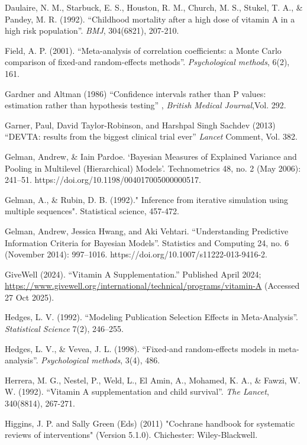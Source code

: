 \documentclass[12pt]{article}
\begin{document}
\begin{thebibliography}{99}
 Daulaire, N. M., Starbuck, E. S., Houston, R. M., Church, M. S., Stukel, T. A., \& Pandey, M. R. (1992). ``Childhood mortality after a high dose of vitamin A in a high risk population''. \emph{BMJ}, 304(6821), 207-210.

 Field, A. P. (2001). ``Meta-analysis of correlation coefficients: a Monte Carlo comparison of fixed-and random-effects methods''. \emph{Psychological methods}, 6(2), 161.

 Gardner and Altman (1986) ``Confidence intervals rather than P values: estimation rather than hypothesis testing'' , \emph{British Medical Journal},Vol. 292.

 Garner, Paul, David Taylor-Robinson, and Harshpal Singh Sachdev (2013) ``DEVTA: results from the biggest clinical trial ever'' \emph{Lancet} Comment, Vol. 382.

 Gelman, Andrew, \& Iain Pardoe. ‘Bayesian Measures of Explained Variance and Pooling in Multilevel (Hierarchical) Models’. Technometrics 48, no. 2 (May 2006): 241–51. https://doi.org/10.1198/004017005000000517.

 Gelman, A., \& Rubin, D. B. (1992)." Inference from iterative simulation using multiple sequences". Statistical science, 457-472.

 Gelman, Andrew, Jessica Hwang, and Aki Vehtari. ``Understanding Predictive Information Criteria for Bayesian Models''. Statistics and Computing 24, no. 6 (November 2014): 997–1016. https://doi.org/10.1007/s11222-013-9416-2.

 GiveWell (2024). ``Vitamin A Supplementation.'' Published April 2024; \url{https://www.givewell.org/international/technical/programs/vitamin-A} (Accessed 27 Oct 2025).

 Hedges, L. V. (1992). ``Modeling Publication Selection Effects in Meta-Analysis''. \emph{Statistical Science} 7(2), 246--255.

 Hedges, L. V., \& Vevea, J. L. (1998). ``Fixed-and random-effects models in meta-analysis''. \emph{Psychological methods}, 3(4), 486.


 Herrera, M. G., Nestel, P., Weld, L., El Amin, A., Mohamed, K. A., \& Fawzi, W. W. (1992). ``Vitamin A supplementation and child survival''. \emph{The Lancet}, 340(8814), 267-271.

 Higgins, J. P. and Sally Green (Eds) (2011) "Cochrane handbook for systematic reviews of interventions" (Version 5.1.0). Chichester: Wiley-Blackwell.


\end{thebibliography}
\end{document}
